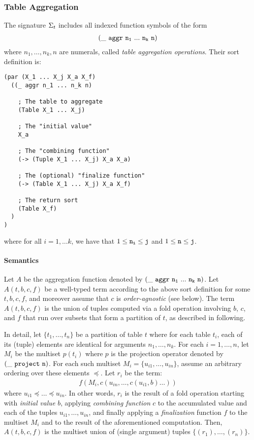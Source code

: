\documentclass[english,a4paper,10pt]{article}
\begin{document}
\subsubsection{Table Aggregation}
The signature $\Sigma_{t}$ includes 
all indexed function symbols of the form
\begin{align*}
{\tt  
(\_\ aggr\ n_1\ ...\ n_k\ n)
}
\end{align*}
where $n_1, \ldots, n_k, n$ are numerals,
called \emph{table aggregation operations}. Their sort definition is:

\begin{verbatim}
(par (X_1 ... X_j X_a X_f) 
  ((_ aggr n_1 ... n_k n)
  
    ; The table to aggregate
    (Table X_1 ... X_j)
    
    ; The "initial value"
    X_a
    
    ; The "combining function"
    (-> (Tuple X_1 ... X_j) X_a X_a)
    
    ; The (optional) "finalize function"
    (-> (Table X_1 ... X_j) X_a X_f)
    
    ; The return sort
    (Table X_f)
  )
)
\end{verbatim}
where for all $i = 1, \ldots k$,
we have that $1 \leq {\tt n_i} \leq {\tt j}$ and $1 \leq {\tt n} \leq {\tt j}$. 

\paragraph{Semantics}
Let $A$ be the aggregation function
denoted by $
{\tt (\_\ aggr\ n_1\ ...\ n_k\ n)}$.
Let $A( t, b, c, f)$ be a well-typed term
according to the above sort definition for some $t, b, c, f$,
and moreover assume that $c$ is \emph{order-agnostic} (see below).
The term $A( t, b, c, f)$ is
the union of tuples computed via a fold operation involving $b$, $c$, and $f$
that run over subsets that form a partition of $t$, as described in following.

In detail,
let $\{ t_1, \ldots, t_n \}$ be a partition of table $t$
where for each table $t_i$, each of its (tuple) elements
are identical for arguments $n_1, \ldots, n_k$.
For each $i = 1, \ldots, n$,
let $M_i$ be the multiset $p(t_i)$
where $p$ is the projection operator denoted by ${\tt (\_\ project\ n)}$.
For each such multiset $M_i = \{ u_{i1}, \ldots, u_{in} \}$,
assume an arbitrary ordering over these elements $\preceq$.
Let $r_i$ be the term:
\begin{align*}
f( M_i, c( u_{in}, \ldots, c( u_{i1}, b ) \ldots ) )
\end{align*}
where $u_{i1} \preceq \ldots \preceq u_{in}$.
In other words,
$r_i$ is the result of a fold operation
starting with \emph{initial value} $b$,
applying \emph{combining function} $c$ to
the accumulated value and each of the tuples $u_{i1}, \ldots, u_{in}$,
and finally applying a \emph{finalization} function $f$
to the multiset $M_i$ and to the result of the aforementioned computation.
Then,
$A( t, b, c, f)$ is
the multiset union of (single argument) tuples $\{ (r_1), \ldots, (r_n) \}$.
\end{document}
